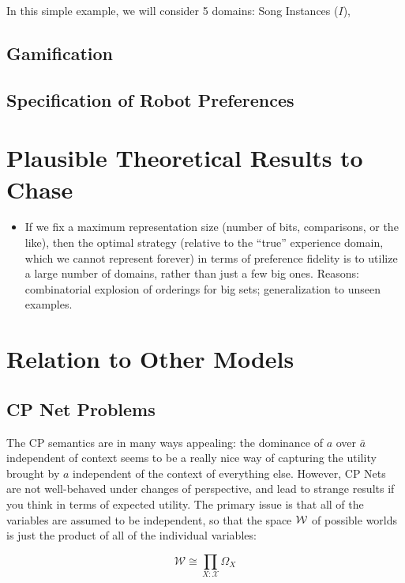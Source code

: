 \documentclass{article}
\begin{document}
	In this simple example, we will consider 5 domains: Song Instances ($I$), 
	
	\subsection{Gamification}
	\subsection{Specification of Robot Preferences}
	
	\section{Plausible Theoretical Results to Chase}
	
	\begin{itemize}
		\item If we fix a maximum representation size (number of bits, comparisons, or the like), then the optimal strategy (relative to the ``true'' experience domain, which we cannot represent forever) in terms of preference fidelity is to utilize a large number of domains, rather than just a few big ones. Reasons: combinatorial explosion of orderings for big sets; generalization to unseen examples.
		
	\end{itemize}
	
	\section{Relation to Other Models}
			
	\subsection{CP Net Problems}
	The CP semantics are in many ways appealing: the dominance of $a$ over $\bar a$ independent of context seems to be a really nice way of capturing the utility brought by $a$ independent of the context of everything else. However, CP Nets are not well-behaved under changes of perspective, and lead to strange results if you think in terms of expected utility. The primary issue is that all of the variables are assumed to be independent, so that the space $\cal W$ of possible worlds is just the product of all of the individual variables:
	
	\[ \mathcal W \cong \prod_{X: \mathcal X} \Omega_X \] 
	
\end{document}
